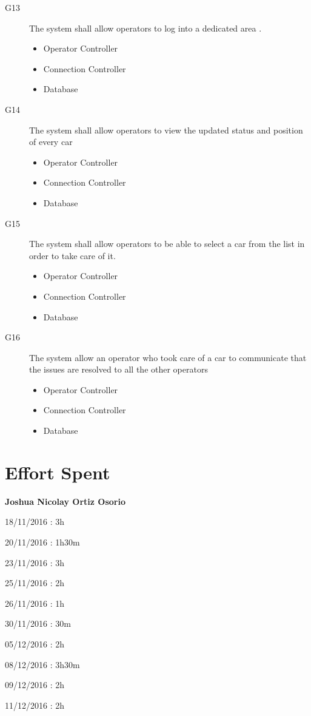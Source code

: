 \documentclass{article}
\begin{document}
\begin{flushleft}
\begin{description}
\item [G13] The system shall allow operators to log into a dedicated area .
\begin{itemize}
\item Operator Controller
\item Connection Controller
\item Database
\end{itemize}
\item [G14] The system shall allow operators to view the updated status and position of every car
\begin{itemize}
\item Operator Controller
\item Connection Controller
\item Database
\end{itemize}
\item [G15] The system shall allow operators to be able to select a car from the list in order to take care of it.
\begin{itemize}
\item Operator Controller
\item Connection Controller
\item Database
\end{itemize}
\item [G16] The system allow an operator who took care of a car to communicate that the issues are resolved to all the other operators
\begin{itemize}
\item Operator Controller
\item Connection Controller
\item Database
\end{itemize}




\end{description}
\newpage
\section{Effort Spent} %

\textbf{Joshua Nicolay Ortiz Osorio} \break
\begin{description}
\item 18/11/2016 : 3h
\item 20/11/2016 : 1h30m
\item 23/11/2016 : 3h
\item 25/11/2016 : 2h
\item 26/11/2016 : 1h
\item 30/11/2016 : 30m
\item 05/12/2016 : 2h
\item 08/12/2016 : 3h30m
\item 09/12/2016 : 2h
\item 11/12/2016 : 2h
\end{description}
\vspace{2cm}


\end{flushleft}
\end{document}
